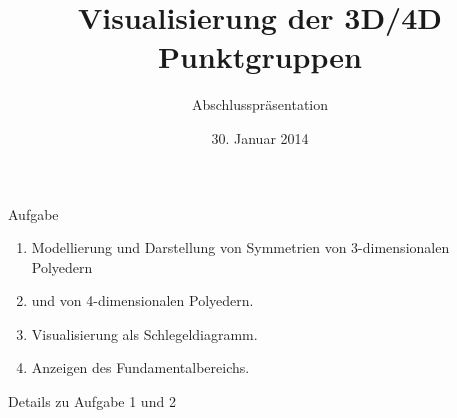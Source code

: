 \documentclass[ucs,11pt]{beamer}
\title[Punktgruppen]{Visualisierung der 3D/4D Punktgruppen}
\subtitle{Abschlusspräsentation}
\institute[FU Berlin]{Freie Universität Berlin}
\date[30.1.2014]{30. Januar 2014}
\begin{document}
\begin{frame}[plain]
	\titlepage
\end{frame}

\begin{frame}{Aufgabe}
	\begin{enumerate}
		\item Modellierung und Darstellung von Symmetrien von 3-dimensionalen Polyedern \pause
		\item und von 4-dimensionalen Polyedern. \pause
		\item Visualisierung als Schlegeldiagramm. \pause
		\item Anzeigen des Fundamentalbereichs.
	\end{enumerate}
\end{frame}


\begin{frame}{Details zu Aufgabe 1 und 2}


\end{frame}
\end{document}
